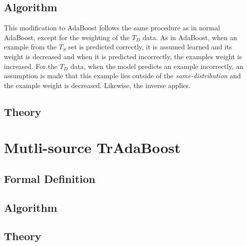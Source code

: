 \documentclass[12pt]{article}
\begin{document}
      \subsection{Algorithm} \label{boost-tradaboost-algo}

        This modification to AdaBoost follows the same procedure as in normal AdaBoost, except for the weighting of the $T_D$ data. As in
        AdaBoost, when an example from the $T_S$ set is predicted correctly, it is assumed learned and its weight is decreased and when it
        is predicted incorrectly, the examples weight is increased. For the $T_D$ data, when the model predicts an example incorrectly,
        an assumption is made that this example lies outside of the {\it same-distribution} and the example weight is decreased. Likewise,
        the inverse applies.

      \subsection{Theory} \label{boost-tradaboost-theory}

    \section{Mutli-source TrAdaBoost} \label{boost-multisource}

      \subsection{Formal Definition} \label{boost-multi-def}

      \subsection{Algorithm} \label{boost-multi-algo}

      \subsection{Theory} \label{boost-multi-theory}

    \printbibliography
\end{document}
